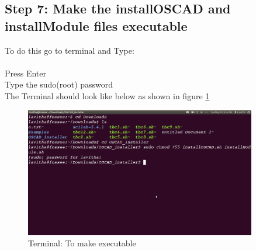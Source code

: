 \subsection {Step 7: Make the installOSCAD and \\
installModule files executable }
To do this go to terminal and Type:\\
\\
Press Enter\\
Type the sudo(root) password\\
The Terminal should look like below as shown in figure \ref{term}
\newpage
\begin{figure}[h!]
\centering
\includegraphics[width=0.9\textwidth]{figures/install3.png}
\caption{Terminal: To make executable}
\label{term}
\end{figure}
